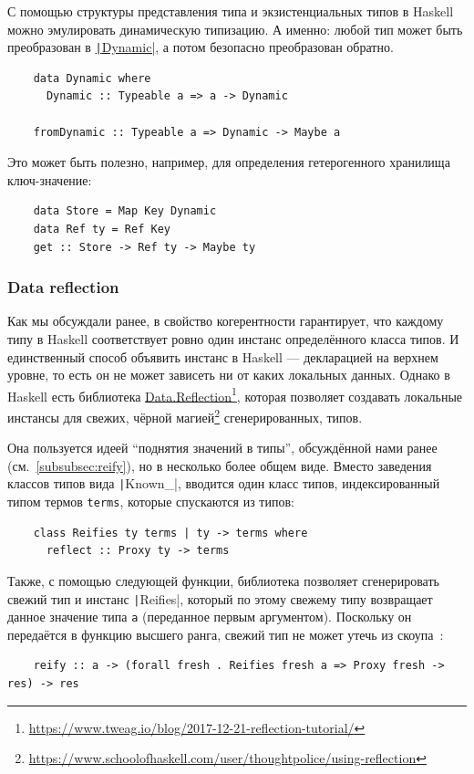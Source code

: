 С помощью структуры представления типа и экзистенциальных типов в Haskell можно эмулировать динамическую типизацию.
А именно: любой тип может быть преобразован в \href{}{\texttt|Dynamic|}, а потом безопасно преобразован обратно.
\begin{verbatim}
    data Dynamic where
      Dynamic :: Typeable a => a -> Dynamic

    fromDynamic :: Typeable a => Dynamic -> Maybe a
\end{verbatim}

Это может быть полезно, например, для определения гетерогенного хранилища ключ-значение:
\begin{verbatim}
    data Store = Map Key Dynamic
    data Ref ty = Ref Key
    get :: Store -> Ref ty -> Maybe ty
\end{verbatim}


\subsubsection{Data reflection} \label{subsubsec:data-reflection}

Как мы обсуждали ранее, в свойство когерентности гарантирует, что каждому типу в Haskell соответствует ровно один инстанс определённого класса типов.
И единственный способ объявить инстанс в Haskell --- декларацией на верхнем уровне, то есть он не может зависеть ни от каких локальных данных.
Однако в Haskell есть библиотека \href{https://hackage.haskell.org/package/reflection-2.1.6/docs/Data-Reflection.html}{Data.Reflection}\footnote{\url{https://www.tweag.io/blog/2017-12-21-reflection-tutorial/}}, которая позволяет создавать локальные инстансы для свежих, чёрной магией\footnote{\url{https://www.schoolofhaskell.com/user/thoughtpolice/using-reflection}} сгенерированных, типов.

Она пользуется идеей ``поднятия значений в типы'', обсуждённой нами ранее (см.~\ref{subsubsec:reify}), но в несколько более общем виде.
Вместо заведения классов типов вида \texttt|Known_|, вводится один класс типов, индексированный типом термов \texttt{terms}, которые спускаются из типов:
\begin{verbatim}
    class Reifies ty terms | ty -> terms where
      reflect :: Proxy ty -> terms
\end{verbatim}

Также, с помощью следующей функции, библиотека позволяет сгенерировать свежий тип и инстанс \texttt|Reifies|, который по этому свежему типу возвращает данное значение типа \texttt{a} (переданное первым аргументом).
Поскольку он передаётся в функцию высшего ранга, свежий тип не может утечь из скоупа~\cite[7.2, ST trick]{maguire-types}:
\begin{verbatim}
    reify :: a -> (forall fresh . Reifies fresh a => Proxy fresh -> res) -> res
\end{verbatim}

